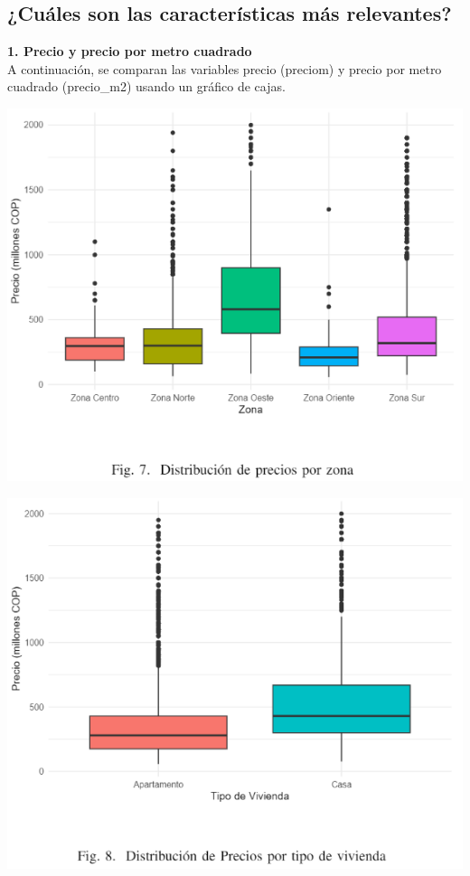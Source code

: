 \documentclass[conference,final,]{IEEEtran}
\begin{document}
\subsection{\textbf{¿Cuáles son las características más relevantes?}}

\textbf{1. Precio y precio por metro cuadrado}\\
A continuación, se comparan las variables precio (preciom) y precio por
metro cuadrado (precio\_m2) usando un gráfico de cajas.\newpage

\includegraphics[width=1\linewidth]{images/BoxplotPreciosZona}

\includegraphics[width=1\linewidth]{images/BoxplotPreciosTipo}
\end{document}
